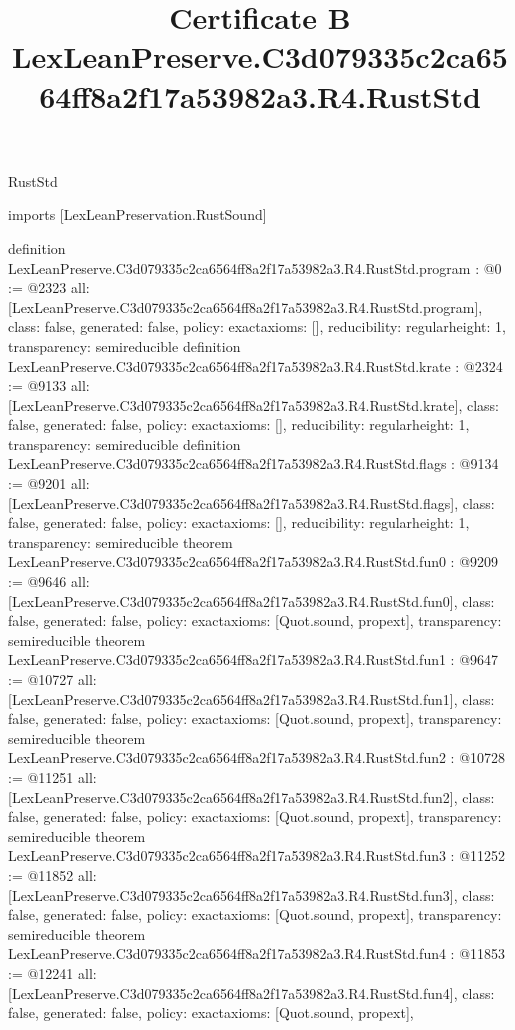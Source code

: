 \begin{lexlean}{RustStd}
\title{Certificate B LexLeanPreserve.C3d079335c2ca6564ff8a2f17a53982a3.R4.RustStd}
\begin{coremodule}
imports [LexLeanPreservation.RustSound]

definition LexLeanPreserve.C3d079335c2ca6564ff8a2f17a53982a3.R4.RustStd.program : @0 := @2323 {
  all: [LexLeanPreserve.C3d079335c2ca6564ff8a2f17a53982a3.R4.RustStd.program],
  class: false,
  generated: false,
  policy: exact{axioms: []},
  reducibility: regular{height: 1},
  transparency: semireducible
}
definition LexLeanPreserve.C3d079335c2ca6564ff8a2f17a53982a3.R4.RustStd.krate : @2324 := @9133 {
  all: [LexLeanPreserve.C3d079335c2ca6564ff8a2f17a53982a3.R4.RustStd.krate],
  class: false,
  generated: false,
  policy: exact{axioms: []},
  reducibility: regular{height: 1},
  transparency: semireducible
}
definition LexLeanPreserve.C3d079335c2ca6564ff8a2f17a53982a3.R4.RustStd.flags : @9134 := @9201 {
  all: [LexLeanPreserve.C3d079335c2ca6564ff8a2f17a53982a3.R4.RustStd.flags],
  class: false,
  generated: false,
  policy: exact{axioms: []},
  reducibility: regular{height: 1},
  transparency: semireducible
}
theorem LexLeanPreserve.C3d079335c2ca6564ff8a2f17a53982a3.R4.RustStd.fun0 : @9209 := @9646 {
  all: [LexLeanPreserve.C3d079335c2ca6564ff8a2f17a53982a3.R4.RustStd.fun0],
  class: false,
  generated: false,
  policy: exact{axioms: [Quot.sound, propext]},
  transparency: semireducible
}
theorem LexLeanPreserve.C3d079335c2ca6564ff8a2f17a53982a3.R4.RustStd.fun1 : @9647 := @10727 {
  all: [LexLeanPreserve.C3d079335c2ca6564ff8a2f17a53982a3.R4.RustStd.fun1],
  class: false,
  generated: false,
  policy: exact{axioms: [Quot.sound, propext]},
  transparency: semireducible
}
theorem LexLeanPreserve.C3d079335c2ca6564ff8a2f17a53982a3.R4.RustStd.fun2 : @10728 := @11251 {
  all: [LexLeanPreserve.C3d079335c2ca6564ff8a2f17a53982a3.R4.RustStd.fun2],
  class: false,
  generated: false,
  policy: exact{axioms: [Quot.sound, propext]},
  transparency: semireducible
}
theorem LexLeanPreserve.C3d079335c2ca6564ff8a2f17a53982a3.R4.RustStd.fun3 : @11252 := @11852 {
  all: [LexLeanPreserve.C3d079335c2ca6564ff8a2f17a53982a3.R4.RustStd.fun3],
  class: false,
  generated: false,
  policy: exact{axioms: [Quot.sound, propext]},
  transparency: semireducible
}
theorem LexLeanPreserve.C3d079335c2ca6564ff8a2f17a53982a3.R4.RustStd.fun4 : @11853 := @12241 {
  all: [LexLeanPreserve.C3d079335c2ca6564ff8a2f17a53982a3.R4.RustStd.fun4],
  class: false,
  generated: false,
  policy: exact{axioms: [Quot.sound, propext]},
}
\end{coremodule}
\end{lexlean}
